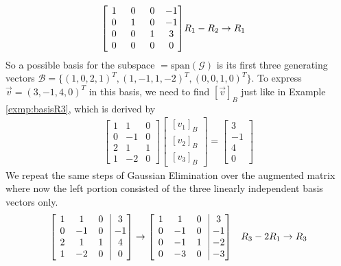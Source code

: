 \begin{solution}
\begin{align*}
\left[\begin{array}{@{\,}wc{10pt}wc{10pt}wc{10pt}wc{10pt}@{\,}}
1 & 0 & 0 & -1\\
0 & 1 & 0 & -1\\
0 & 0 & 1 & 3\\
0 & 0 & 0 & 0 
\end{array}
\right] & 
R_1 - R_2 \to R_1
\end{align*}
So a possible basis for the subspace $= \text{span}(\mathcal{G})$ is its first three generating vectors $\mathcal{B} = \{(1,0,2,1)^T, (1,-1,1,-2)^T, (0,0,1,0)^T\}$. To express $\vec{v} = (3,-1,4,0)^T$ in this basis, we need to find $[\vec{v}]_B$ just like in Example \ref{exmp:basisR3}, which is derived by
\begin{align*}
\begin{bmatrix}
1 & 1 & 0 \\
0 & -1 & 0 \\
2 & 1 & 1 \\
1 & -2 & 0
\end{bmatrix}
\begin{bmatrix}
[v_1]_B \\
[v_2]_B \\
[v_3]_B
\end{bmatrix} =
\begin{bmatrix}
3 \\
-1 \\
4 \\
0
\end{bmatrix}
\end{align*}
We repeat the same steps of Gaussian Elimination over the augmented matrix where now the left portion consisted of the three linearly independent basis vectors only.
\begin{align*}
\left[\begin{array}{@{\,}wc{10pt}wc{10pt}wc{10pt}|wc{10pt}@{\,}}
1 & 1 & 0 & 3\\
0 & -1 & 0 & -1\\
2 & 1 & 1 & 4\\
1 & -2 & 0 & 0 
\end{array}\right] &\to
\left[\begin{array}{@{\,}wc{10pt}wc{10pt}wc{10pt}|wc{10pt}@{\,}}
1 & 1 & 0 & 3 \\
0 & -1 & 0 & -1\\
0 & -1 & 1 & -2\\
0 & -3 & 0 & -3 
\end{array}\right]
& \begin{aligned}
R_3 - 2R_1 &\to R_3 \\

\end{aligned}
\end{align*}
\end{solution}
